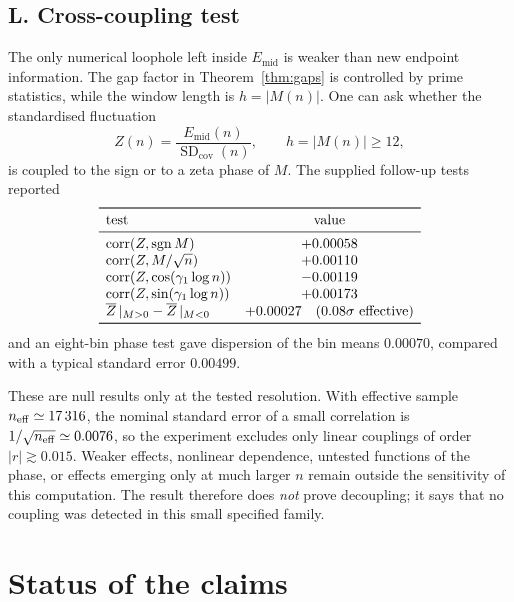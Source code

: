 \documentclass[11pt]{amsart}
\numberwithin{equation}{section}
\theoremstyle{plain}
\theoremstyle{definition}
\theoremstyle{remark}
\begin{document}
\subsection{L. Cross-coupling test}
\label{sec:coupling}
The only numerical loophole left inside $E_{\mathrm{mid}}$ is weaker than new
endpoint information. The gap factor in Theorem~\ref{thm:gaps} is controlled by
prime statistics, while the window length is $h=|M(n)|$. One can ask whether
the standardised fluctuation
\begin{equation}
\label{eq:standardized-residual}
Z(n)=\frac{E_{\mathrm{mid}}(n)}{\operatorname{SD}_{\mathrm{cov}}(n)},
\qquad h=|M(n)|\ge12,
\end{equation}
is coupled to the sign or to a zeta phase of $M$. The supplied follow-up tests
reported
\begin{equation}
\label{eq:coupling-table}
\begin{array}{lc}
\toprule
\text{test} & \text{value}\\
\midrule
\operatorname{corr}(Z,\operatorname{sgn}M) & +0.00058\\
\operatorname{corr}(Z,M/\sqrt n) & +0.00110\\
\operatorname{corr}(Z,\cos(\gamma_1\log n)) & -0.00119\\
\operatorname{corr}(Z,\sin(\gamma_1\log n)) & +0.00173\\
\overline Z\,|_{M>0}-\overline Z\,|_{M<0} & +0.00027\quad(0.08\sigma\ \text{effective})\\
\bottomrule
\end{array}
\end{equation}
and an eight-bin phase test gave dispersion of the bin means $0.00070$, compared
with a typical standard error $0.00499$.

These are null results only at the tested resolution. With effective sample
$n_{\rm eff}\simeq17\,316$, the nominal standard error of a small correlation is
$1/\sqrt{n_{\rm eff}}\simeq0.0076$, so the experiment excludes only linear
couplings of order $|r|\gtrsim0.015$. Weaker effects, nonlinear dependence,
untested functions of the phase, or effects emerging only at much larger $n$
remain outside the sensitivity of this computation. The result therefore does
\emph{not} prove decoupling; it says that no coupling was detected in this small
specified family.

\section{Status of the claims}
\label{sec:status}
\end{document}
